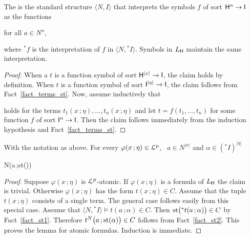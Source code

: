 \documentclass[10pt,oneside]{amsproc}
\renewcommand*{\emph}[1]{%
   \smash{\tikz[baseline]\node[rectangle, fill=teal!25, rounded corners, inner xsep=0.5ex, inner ysep=0.2ex, anchor=base, minimum height = 2.7ex]{\strut #1};}}
\begin{document}
The \emph{standard part of $\langle N,{}^*\!\!I\rangle$\/} is the standard structure $\langle N,I\rangle$ that interprets the symbols $f$ of sort ${\sf H}^n\to {\sf I}$ as the functions

\hfill for all $a\in N^n$,

where ${}^*\!\!f$ is the interpretation of $f$ in  $\langle N,{}^*\!\!I\rangle$.
Symbols in $L_{\sf H}$ maintain the same interpretation.

\begin{proof}
  When a $t$ is a function symbol of sort  ${\sf H}^{|x|}\to {\sf I}$, the claim holds by definition.
  When $t$ is a function symbol of sort ${\sf I}^{|\eta|}\to {\sf I}$, the claim follows from Fact~\ref{fact_terms_st}.
  Now, assume inductively that 


  holds for the terms $t_1(x\,;\eta),\dots,t_n(x\,;\eta)$ and let $t=f(t_1,\dots,t_n)$ for some function $f$ of sort ${\sf I}^n\to {\sf I}$.
  Then the claim follows immediately from the induction hypothesis and Fact~\ref{fact_terms_st}.
\end{proof}


\begin{lemma}\label{lem_st}
  With the notation as above.
  For every $\varphi(x\,;\eta)\in{\EuScript L}^{\rm p}$, \  $a\in N^{|x|}$ and $\alpha\in({}^*\!\!I)^{|\eta|}$ 
  
  {\Rightarrow}
  {N\models\varphi\big(a\,;{\rm st}(\alpha)\big)}
\end{lemma}

\begin{proof}
  Suppose $\varphi(x\,;\eta)$ is ${\EuScript L}^{\rm p}$-atomic.
  If $\varphi(x\,;\eta)$ is a formula of $L_{\sf H}$ the claim is trivial. 
  Otherwise $\varphi(x\,;\eta)$ has the form $t(x\,;\eta)\in C$.
  Assume that the tuple $t(x\,;\eta)$ consists of a single term.
  The general case follows easily from this special case. 
  Assume that $\langle N,{}^*\!\!I\rangle\models t(a\,;\alpha)\in C$.
  Then ${\rm st}\big({}^*t(a\,;\alpha)\big)\in C$ by Fact~\ref{fact_st1}.
  Therefore $t^N\big(a\,;{\rm st}(\alpha)\big)\in C$ follows from Fact~\ref{fact_st2}.
  This proves the lemma for atomic formulas.
  Induction is immediate. 
\end{proof}
\end{document}
